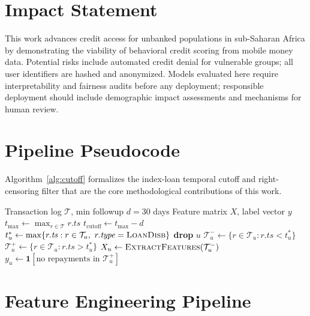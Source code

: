 \documentclass{article}
\begin{document}
\section*{Impact Statement}

This work advances credit access for unbanked populations in sub-Saharan
Africa by demonstrating the viability of behavioral credit scoring from
mobile money data.
Potential risks include automated credit denial for vulnerable groups;
all user identifiers are hashed and anonymized.
Models evaluated here require interpretability and fairness audits before
any deployment; responsible deployment should include demographic impact
assessments and mechanisms for human review.




\clearpage
\onecolumn
\appendix

\section{Pipeline Pseudocode}
\label{app:pseudocode}

Algorithm~\ref{alg:cutoff} formalizes the index-loan temporal cutoff
and right-censoring filter that are the core methodological
contributions of this work.

\begin{algorithm}[h]
\caption{Index-loan cutoff and right-censoring filter}
\label{alg:cutoff}
\begin{algorithmic}
\REQUIRE Transaction log $\mathcal{T}$, min followup $d = 30$ days
\ENSURE Feature matrix $X$, label vector $y$
\STATE $t_{\max} \gets \max_{r \in \mathcal{T}} r.\mathit{ts}$
\STATE $t_{\text{cutoff}} \gets t_{\max} - d$
  \STATE $t^*_u \gets \max\{r.\mathit{ts} : r \in \mathcal{T}_u,\ r.\mathit{type} = \textsc{LoanDisb}\}$
    \STATE \textbf{drop} $u$ 
  \ELSE
    \STATE $\mathcal{T}^-_u \gets \{r \in \mathcal{T}_u : r.\mathit{ts} < t^*_u\}$ 
    \STATE $\mathcal{T}^+_u \gets \{r \in \mathcal{T}_u : r.\mathit{ts} > t^*_u\}$ 
    \STATE $X_u \gets \textsc{ExtractFeatures}(\mathcal{T}^-_u)$
    \STATE $y_u \gets \mathbf{1}[\text{no repayments in } \mathcal{T}^+_u]$
  \ENDIF
\ENDFOR
\end{algorithmic}
\end{algorithm}

\section{Feature Engineering Pipeline}
\label{app:flowchart}
\end{document}
